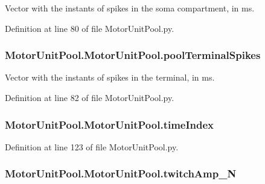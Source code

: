 Vector with the instants of spikes in the soma compartment, in ms. 



Definition at line 80 of file Motor\-Unit\-Pool.\-py.

\hypertarget{class_motor_unit_pool_1_1_motor_unit_pool_a4f0b93df27eb6303fa1a3d49653d4fd3}{
\subsubsection[{pool\-Terminal\-Spikes}]{\setlength{\rightskip}{0pt plus 5cm}Motor\-Unit\-Pool.\-Motor\-Unit\-Pool.\-pool\-Terminal\-Spikes}}\label{class_motor_unit_pool_1_1_motor_unit_pool_a4f0b93df27eb6303fa1a3d49653d4fd3}


Vector with the instants of spikes in the terminal, in ms. 



Definition at line 82 of file Motor\-Unit\-Pool.\-py.

\hypertarget{class_motor_unit_pool_1_1_motor_unit_pool_ab5659e1c9355ecf529d9b8be8cbf6d65}{
\subsubsection[{time\-Index}]{\setlength{\rightskip}{0pt plus 5cm}Motor\-Unit\-Pool.\-Motor\-Unit\-Pool.\-time\-Index}}\label{class_motor_unit_pool_1_1_motor_unit_pool_ab5659e1c9355ecf529d9b8be8cbf6d65}


Definition at line 123 of file Motor\-Unit\-Pool.\-py.

\hypertarget{class_motor_unit_pool_1_1_motor_unit_pool_a03538b06e7220f9d48c7306ed6508c05}{
\subsubsection[{twitch\-Amp\-\_\-\-N}]{\setlength{\rightskip}{0pt plus 5cm}Motor\-Unit\-Pool.\-Motor\-Unit\-Pool.\-twitch\-Amp\-\_\-\-N}}\label{class_motor_unit_pool_1_1_motor_unit_pool_a03538b06e7220f9d48c7306ed6508c05}


